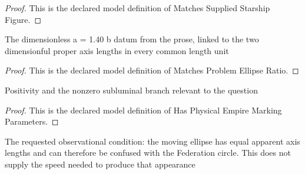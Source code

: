 \begin{proof}
  This is the declared model definition of Matches Supplied Starship Figure.
\end{proof}
\begin{definition}
  \label{def:physics:phyx-mini-0608:phyxminiproblems-problemphyxmini0608-matchesproblemellipseratio}
  The dimensionless a = 1.40 b datum from the prose, linked to the two dimensionful proper axis lengths in every common length unit
\end{definition}
\begin{proof}
  This is the declared model definition of Matches Problem Ellipse Ratio.
\end{proof}
\begin{definition}
  \label{def:physics:phyx-mini-0608:phyxminiproblems-problemphyxmini0608-hasphysicalempiremarkingparameters}
  Positivity and the nonzero subluminal branch relevant to the question
\end{definition}
\begin{proof}
  This is the declared model definition of Has Physical Empire Marking Parameters.
\end{proof}
\begin{definition}
  \label{def:physics:phyx-mini-0608:phyxminiproblems-problemphyxmini0608-appearsasfederationcircle}
  The requested observational condition: the moving ellipse has equal apparent axis lengths and can therefore be confused with the Federation circle. This does not supply the speed needed to produce that appearance
\end{definition}
